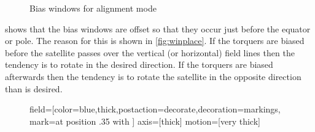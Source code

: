 \begin{figure}[H]
    \centering
    
    \caption{Bias windows for alignment mode}
    \label{fig:windows}
\end{figure}

 shows that the bias windows are offset so that they occur just before the equator or pole. The reason for this is shown in \cref{fig:winplace}. If the torquers are biased before the satellite passes over the vertical (or horizontal) field lines then the tendency is to rotate in the desired direction. If the torquers are biased afterwards then the tendency is to rotate the satellite in the opposite direction than is desired.\cite{Mentch11}

\begin{figure}[htb!]
    \centering
    \newcommand{\cubesat}[2]{
        \draw (#1:#2) node{\pgftext[rotate=#1]{\texttt{[image: cube-icon]}}};
        \draw[->,cyan,axis] (#1:#2) -- +(#1+90:\axlen);
        \draw (#1:#2) ++(#1+90:\axlen) node[rotate=#1-90,anchor=south west] {\tiny +Y};
        \draw[->,red,axis] (#1:#2) -- +(#1:\axlen);
        \draw (#1:#2) ++(#1:\axlen) node[rotate=#1-90,anchor=north west] {\tiny -Z};
    }

    \tikzstyle field=[color=blue,thick,postaction={decorate,decoration={markings,
        mark=at position .35 with {}}}]
    \tikzstyle axis=[thick]
    \tikzstyle motion=[very thick]
    
\end{figure}
